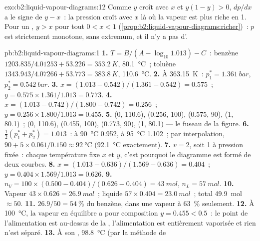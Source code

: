 \begin{solution}{exo:b2:liquid-vapour-diagrams:12}
Comme $y$ croît avec $x$ et $y(1 - y) > 0$, $dp/dx$ a le signe de $y - x$~:
la pression croît avec $x$ là où la vapeur est plus riche en 1. Pour un , $y > x$ pour tout $0 < x < 1$ (\cref{prop:b2:liquid-vapour-diagrams:richer})~:
$p$ est strictement monotone, sans extremum, et il n'y a pas d'.
\end{solution}

\begin{solution}{pb:b2:liquid-vapour-diagrams:1}
\textbf{1.} $T = B/(A - \log_{10}1.013) - C$~: benzène $1203.835/4.01253 + 53.226 =
\qty{353.2}{K}$, \qty{80.1}{\degreeCelsius}~; toluène $1343.943/4.07266 + 53.773 =
\qty{383.8}{K}$, \qty{110.6}{\degreeCelsius}.
\textbf{2.} À \qty{363.15}{K}~: $p_1^* = \qty{1.361}{bar}$, $p_2^* = \qty{0.542}{bar}$.
\textbf{3.} $x = (1.013 - 0.542)/(1.361 - 0.542) = 0.575$~; $y = 0.575 \times
1.361/1.013 = 0.773$.
\textbf{4.} $x = (1.013 - 0.742)/(1.800 - 0.742) = 0.256$~; $y = 0.256 \times
1.800/1.013 = 0.455$.
\textbf{5.}  (0, 110.6), (0.256, 100), (0.575, 90), (1, 80.1)~;  (0, 110.6), (0.455, 100), (0.773, 90), (1, 80.1) --- le fuseau de la
figure.
\textbf{6.} $\frac12(p_1^* + p_2^*) = 1.013$~: à \qty{90}{\degreeCelsius} 0.952, à
\qty{95}{\degreeCelsius} 1.102~; par interpolation, $90 + 5 \times 0.061/0.150 \approx
\qty{92}{\degreeCelsius}$ (\qty{92.1}{\degreeCelsius} exactement).
\textbf{7.} $v = 2$, soit 1 à pression fixée~: chaque température fixe $x$ et $y$,
c'est pourquoi le diagramme est formé de deux courbes.
\textbf{8.} $x = (1.013 - 0.636)/(1.569 - 0.636) = 0.404$~; $y = 0.404 \times
1.569/1.013 = 0.626$.
\textbf{9.} $n_V = 100 \times (0.500 - 0.404)/(0.626 - 0.404) = \qty{43}{mol}$,
$n_L = \qty{57}{mol}$.
\textbf{10.} Vapeur $43 \times 0.626 = \qty{26.9}{mol}$~; liquide $57 \times 0.404
= \qty{23.0}{mol}$~; total \qty{49.9}{mol} $\approx 50$.
\textbf{11.} $26.9/50 = 54~\%$ du benzène, dans une vapeur à 63~\% seulement.
\textbf{12.} À \qty{100}{\degreeCelsius}, la vapeur en équilibre a pour composition $y =
0.455 < 0.5$~: le point de l'alimentation est au-dessus de la , l'alimentation est entièrement
vaporisée et rien n'est séparé.
\textbf{13.} À son , \qty{98.8}{\degreeCelsius} (par la méthode de

\end{solution}
